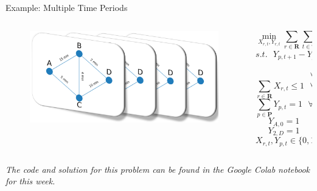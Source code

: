\documentclass[10pt, aspectratio=169]{beamer}
\begin{document}
\begin{frame}{Example: Multiple Time Periods}
    \begin{columns}
        \begin{column}{0.5\textwidth}
            \begin{figure}
                \includegraphics[width=0.7\linewidth]{RoutePlanningProblemRepeated.png}
            \end{figure}
        \end{column}
        \begin{column}{0.5\textwidth}
            $$\min_{X_{r,t},Y_{r,t}} \sum_{r \in \textbf{R}} \sum_{t \in \textbf{T}} \delta_{r,t} X_{r,t}$$
            $$s.t.\ \ \ Y_{p,t+1} - Y_{p,t} = \sum_{r\in\textbf{R}^+_p} X_{r,t} - \sum_{r\in\textbf{R}^-_p} X_{r,t}$$
            $$\phantom\ \ \ \ \ \ \ \ \ \ \ \ \ \ \ \ \ \ \ \ \ \ \ \ \ \ \ \ \ \forall p \in \textbf{P}, t \in \textbf{T} \neq 3$$
            $$\sum_{r \in \textbf{R}} X_{r,t} \leq 1 \ \ \ \forall t \in \textbf{T}$$
            $$\sum_{p \in \textbf{P}} Y_{p,t} = 1 \ \ \ \forall t \in \textbf{T}$$
            $$Y_{A,0} = 1$$
            $$Y_{2,D} = 1$$
            $$X_{r,t}, Y_{p,t} \in \{0,1\}$$
        \end{column}
    \end{columns}
    \begin{center}
        \textit{The code and solution for this problem can be found in the Google Colab notebook for this week.}
    \end{center}
\end{frame}
\end{document}

